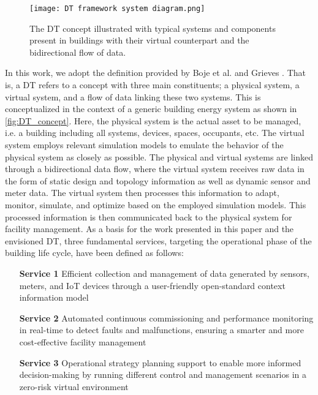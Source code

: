 \begin{figure*}[t!]
    \centering
    \texttt{[image: DT framework system diagram.png]}
    \caption{The DT concept illustrated with typical systems and components present in buildings with their virtual counterpart and the bidirectional flow of data.}
    \label{fig:DT_concept}
\end{figure*}

In this work, we adopt the definition provided by Boje et al. \cite{BOJE2020103179} and Grieves \cite{Grieves2015}. That is, a DT refers to a concept with three main constituents; a physical system, a virtual system, and a flow of data linking these two systems. This is conceptualized in the context of a generic building energy system as shown in \autoref{fig:DT_concept}. Here, the physical system is the actual asset to be managed, i.e. a building including all systems, devices, spaces, occupants, etc. The virtual system employs relevant simulation models to emulate the behavior of the physical system as closely as possible. The physical and virtual systems are linked through a bidirectional data flow, where the virtual system receives raw data in the form of static design and topology information as well as dynamic sensor and meter data. The virtual system then processes this information to adapt, monitor, simulate, and optimize based on the employed simulation models. This processed information is then communicated back to the physical system for facility management. As a basis for the work presented in this paper and the envisioned DT, three fundamental services, targeting the operational phase of the building life cycle, have been defined as follows:




\begin{enumerate}[align=left]
    \item[\textbf{Service 1}] Efficient collection and management of data generated by sensors, meters, and IoT devices through a user-friendly open-standard context information model
    \item[\textbf{Service 2}] Automated continuous commissioning and performance monitoring in real-time to detect faults and malfunctions, ensuring a smarter and more cost-effective facility management
    \item[\textbf{Service 3}] Operational strategy planning support to enable more informed decision-making by running different control and management scenarios in a zero-risk virtual environment 
\end{enumerate}





